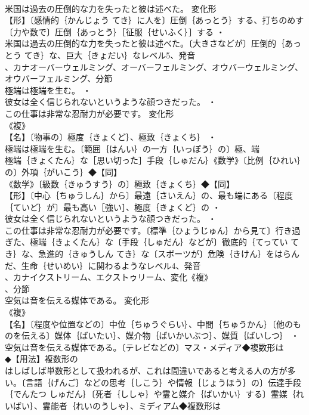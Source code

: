 \documentclass[8pt]{extreport}
\begin{document}
\begin{CJK}{UTF8}{min}
\\	米国は過去の圧倒的な力を失ったと彼は述べた。	変化形 
\\	【形】〔感情的｛かんじょう てき｝に人を〕圧倒｛あっとう｝する、打ちのめす〔力や数で〕圧倒｛あっとう｝［征服｛せいふく｝］する ・
\\	米国は過去の圧倒的な力を失ったと彼は述べた。〔大きさなどが〕圧倒的｛あっとう てき｝な、巨大｛きょだい｝なレベル5、発音
\\	、カナオーバーウェルミング、オーバーフェルミング、オウバーウェルミング、オウバーフェルミング、分節
\\	極端は極端を生む。 ・
\\	彼女は全く信じられないというような顔つきだった。 ・
\\	この仕事は非常な忍耐力が必要です。	変化形 
\\	《複》
\\	【名】〔物事の〕極度｛きょくど｝、極致｛きょくち｝ ・
\\	極端は極端を生む。〔範囲｛はんい｝の一方｛いっぽう｝の〕極、端
\\	極端｛きょくたん｝な［思い切った］手段｛しゅだん｝《数学》〔比例｛ひれい｝の〕外項｛がいこう｝◆【同】
\\	《数学》〔級数｛きゅうすう｝の〕極致｛きょくち｝◆【同】
\\	【形】〔中心｛ちゅうしん｝から〕最遠｛さいえん｝の、最も端にある〔程度｛ていど｝が〕最も高い［強い］、極度｛きょくど｝の ・
\\	彼女は全く信じられないというような顔つきだった。 ・
\\	この仕事は非常な忍耐力が必要です。〔標準｛ひょうじゅん｝から見て〕行き過ぎた、極端｛きょくたん｝な〔手段｛しゅだん｝などが〕徹底的｛てってい てき｝な、急進的｛きゅうしん てき｝な〔スポーツが〕危険｛きけん｝をはらんだ、生命｛せいめい｝に関わるようなレベル4、発音
\\	、カナイクストリーム、エクストゥリーム、変化《複》
\\	、分節
\\	空気は音を伝える媒体である。	変化形 
\\	《複》
\\	【名】〔程度や位置などの〕中位｛ちゅうぐらい｝、中間｛ちゅうかん｝〔他のものを伝える〕媒体｛ばいたい｝、媒介物｛ばいかいぶつ｝、媒質｛ばいしつ｝ ・
\\	空気は音を伝える媒体である。〔テレビなどの〕マス・メディア◆複数形は
\\	◆【用法】複数形の
\\	はしばしば単数形として扱われるが、これは間違いであると考える人の方が多い。〔言語｛げんご｝などの思考｛しこう｝や情報｛じょうほう｝の〕伝達手段｛でんたつ しゅだん｝〔死者｛ししゃ｝や霊と媒介｛ばいかい｝する〕霊媒｛れいばい｝、霊能者｛れいのうしゃ｝、ミディアム◆複数形は

\end{CJK}
\end{document}
